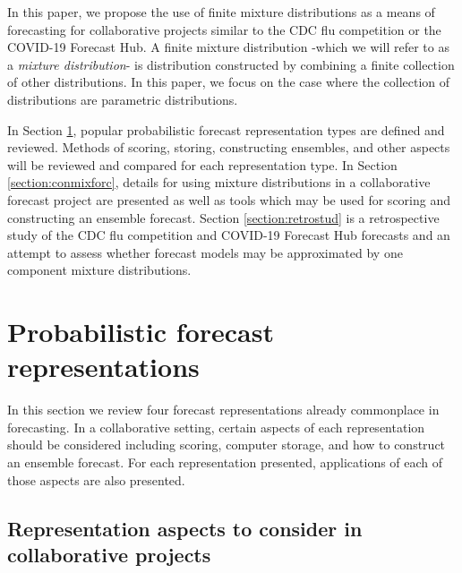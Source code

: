 \documentclass[11pt,notitlepage]{isuthesis}
\begin{document}
In this paper, we propose the use of finite mixture distributions as a means 
of forecasting for collaborative projects similar to the CDC flu competition or 
the COVID-19
Forecast Hub. A finite mixture distribution -which we will refer to as a
\emph{mixture distribution}- is distribution constructed by combining a finite 
collection of other distributions. In this paper, we focus on the case where the
collection of distributions are parametric distributions.

In Section \ref{section:representations}, 
popular probabilistic forecast representation 
types are defined and reviewed. Methods of scoring, storing, constructing 
ensembles, and other aspects will be reviewed and compared for each 
representation type.
In Section \ref{section:conmixforc}, details for using mixture 
distributions in a collaborative forecast project are presented as well as tools
which may be used for scoring and constructing an ensemble forecast.
Section \ref{section:retrostud} is a retrospective study of the CDC flu 
competition and COVID-19 Forecast Hub
forecasts and an attempt to assess whether forecast models
may be approximated by one component mixture distributions.






















\chapter{Probabilistic forecast representations}
\label{section:representations}

In this section we review four forecast representations already commonplace in 
forecasting. In a collaborative setting, certain aspects of each representation
should be considered including scoring, computer storage, and how to construct
an ensemble forecast. For each representation presented, applications of each of 
those aspects are also presented.


\section{Representation aspects to consider in collaborative projects}
\end{document}
